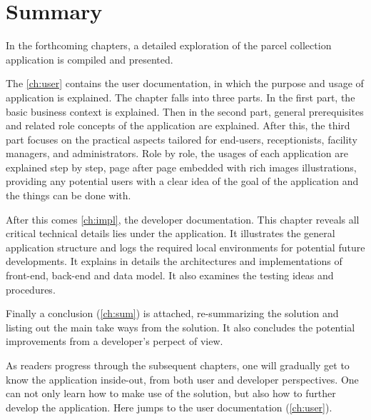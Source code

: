 \section{Summary}
\label{sec:IntroSum}

In the forthcoming chapters, a detailed exploration of the parcel collection application is compiled and presented. 

The \autoref{ch:user} contains the user documentation, in which the purpose and usage of application is explained. The chapter falls into three parts. In the first part, the basic business context is explained. Then in the second part, general prerequisites and related role concepts of the application are explained. After this, the third part focuses on the practical aspects tailored for end-users, receptionists, facility managers, and administrators. Role by role, the usages of each application are explained step by step, page after page embedded with rich images illustrations, providing any potential users with a clear idea of the goal of the application and the things can be done with. 

After this comes \autoref{ch:impl}, the developer documentation. This chapter reveals all critical technical details lies under the application. It illustrates the general application structure and logs the required local environments for potential future developments. It explains in details the architectures and implementations of front-end, back-end and data model. It also examines the testing ideas and procedures. 

Finally a conclusion (\autoref{ch:sum}) is attached, re-summarizing the solution and listing out the main take ways from the solution. It also concludes the potential improvements from a developer's perpect of view.

As readers progress through the subsequent chapters, one will gradually get to know the application inside-out, from both user and developer perspectives. One can not only learn how to make use of the solution, but also how to further develop the application.
Here jumps to the user documentation (\autoref{ch:user}).



